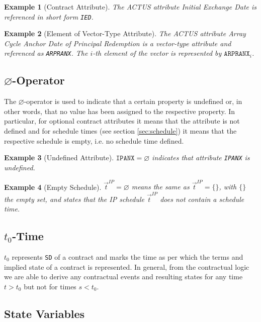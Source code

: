 \documentclass[9pt,oneside]{amsart}
\newtheorem{example}{Example}
\newcommand{\attr}[1]{\texttt{#1}}
\newcommand{\undef}{\varnothing}
\begin{document}
\begin{multicols}{2}
\begin{example}[Contract Attribute]
The ACTUS attribute \textit{Initial Exchange Date} is referenced in short form \attr{IED}.
\end{example}


\begin{example}[Element of Vector-Type Attribute]
The ACTUS attribute \textit{Array Cycle Anchor Date of Principal Redemption} is a vector-type attribute and referenced as \attr{ARPRANX}. The $i$-th element of the vector is represented by $\attr{ARPRANX}_i$.
\end{example}


\subsection{$\undef$-Operator}\label{sec:undef}

The $\undef$-operator is used to indicate that a certain property is undefined or, in other words, that no value has been assigned to the respective property. In particular, for optional contract attributes it means that the attribute is not defined and for schedule times (see section \ref{sec:schedule}) it means that the respective schedule is empty, i.e. no schedule time defined.

\begin{example}[Undefined Attribute]
$\attr{IPANX}=\undef$ indicates that attribute \attr{IPANX} is undefined.
\end{example}

\begin{example}[Empty Schedule]
$\vec{t}^{IP}=\undef$ means the same as $\vec{t}^{IP}=\{\}$, with $\{\}$ the empty set, and states that the IP schedule $\vec{t}^{IP}$ does not contain a schedule time.
\end{example}


\subsection{$t_0$-Time}\label{sec:t0time}

$t_0$ represents \attr{SD} of a contract and marks the time as per which the terms and implied state of a contract is represented. In general, from the contractual logic we are able to derive any contractual events and resulting states for any time $t>t_0$ but not for times $s<t_0$.


\subsection{State Variables}\label{sec:statevarsnotat}


\end{multicols}
\end{document}
